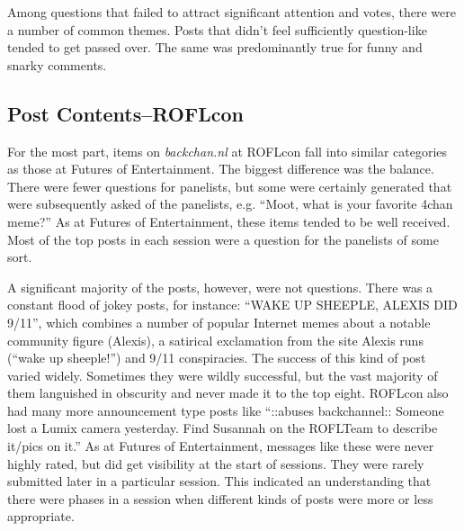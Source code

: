 Among questions that failed to attract significant attention and votes, there were a number of common themes. Posts that didn't feel sufficiently question-like tended to get passed over. The same was predominantly true for funny and snarky comments. 

\subsection{Post Contents--ROFLcon}
For the most part, items on \emph{backchan.nl} at ROFLcon fall into similar categories as those at Futures of Entertainment. The biggest difference was the balance. There were fewer questions for panelists, but some were certainly generated that were subsequently asked of the panelists, e.g. ``Moot, what is your favorite 4chan meme?'' As at Futures of Entertainment, these items tended to be well received. Most of the top posts in each session were a question for the panelists of some sort.

A significant majority of the posts, however, were not questions. There was a constant flood of jokey posts, for instance: ``WAKE UP SHEEPLE, ALEXIS DID 9/11'', which combines a number of popular Internet memes about a notable community figure (Alexis), a satirical exclamation from the site Alexis runs (``wake up sheeple!'') and 9/11 conspiracies. The success of this kind of post varied widely. Sometimes they were wildly successful, but the vast majority of them languished in obscurity and never made it to the top eight. ROFLcon also had many more announcement type posts like ``::abuses backchannel:: Someone lost a Lumix camera yesterday. Find Susannah on the ROFLTeam to describe it/pics on it.'' As at Futures of Entertainment, messages like these were never highly rated, but did get visibility at the start of sessions. They were rarely submitted later in a particular session. This indicated an understanding that there were phases in a session when different kinds of posts were more or less appropriate. 

